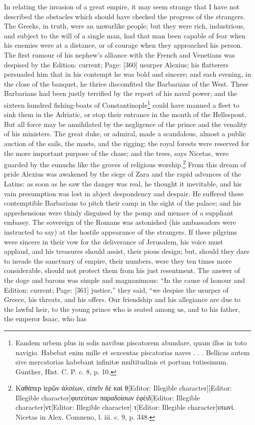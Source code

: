 In relating the invasion of a great empire, it may seem strange that I have not described the obstacles which should have checked the progress of the strangers. The Greeks, in truth, were an unwarlike people; but they were rich, industrious, and subject to the will of a single man, had that man been capable of fear when his enemies were at a distance, or of courage when they approached his person. The first rumour of his nephew\texthebrew{}’s alliance with the French and Venetians was despised by the Edition: current; Page: [360] usurper Alexius; his flatterers persuaded him that in his contempt he was bold and sincere; and each evening, in the close of the banquet, he thrice discomfited the Barbarians of the West. These Barbarians had been justly terrified by the report of his naval power; and the sixteen hundred fishing-boats of Constantinople\footnote{Eandem urbem plus in solis navibus piscatorem abundare, quam illos in toto navigio. Habebat enim mille et sexcentas piscatorias naves . . . Bellicas autem sive mercatorias habebant infinitæ multitudinis et portum tutissimum. Gunther, Hist. C. P. c. 8, p. 10.} could have manned a fleet to sink them in the Adriatic, or stop their entrance in the mouth of the Hellespont. But all force may be annihilated by the negligence of the prince and the venality of his ministers. The great duke, or admiral, made a scandalous, almost a public auction of the sails, the masts, and the rigging; the royal forests were reserved for the more important purpose of the chase; and the trees, says Nicetas, were guarded by the eunuchs like the groves of religious worship.\footnote{\textgreek{Καθάπερ \texthebrew{ἱ}ερ\texthebrew{ῶ}ν \texthebrew{ἀ}λσέων, ε\texthebrew{ἰ}πε\texthebrew{ῖ}ν δ\texthebrew{ὲ} κα\texthebrew{ὶ} θ}[Editor: Illegible character][Editor: Illegible character]\textgreek{φυτεύτων παραδο\texthebrew{ἰ}σων \texthebrew{ἐ}φέιδ}[Editor: Illegible character]\textgreek{ντ}[Editor: Illegible character] \textgreek{τ}[Editor: Illegible character]\textgreek{υτωνί}. Nicetas in Alex. Comneno, l. iii. c. 9, p. 348.} From this dream of pride Alexius was awakened by the siege of Zara and the rapid advances of the Latins: as soon as he saw the danger was real, he thought it inevitable, and his vain presumption was lost in abject despondency and despair. He suffered these contemptible Barbarians to pitch their camp in the sight of the palace; and his apprehensions were thinly disguised by the pomp and menace of a suppliant embassy. The sovereign of the Romans was astonished (his ambassadors were instructed to say) at the hostile appearance of the strangers. If these pilgrims were sincere in their vow for the deliverance of Jerusalem, his voice must applaud, and his treasures should assist, their pious design; but, should they dare to invade the sanctuary of empire, their numbers, were they ten times more considerable, should not protect them from his just resentment. The answer of the doge and barons was simple and magnanimous: \texthebrew{“}In the cause of honour and Edition: current; Page: [361] justice,\texthebrew{}” they said, \texthebrew{“}we despise the usurper of Greece, his threats, and his offers. Our friendship and his allegiance are due to the lawful heir, to the young prince who is seated among us, and to his father, the emperor Isaac, who has 